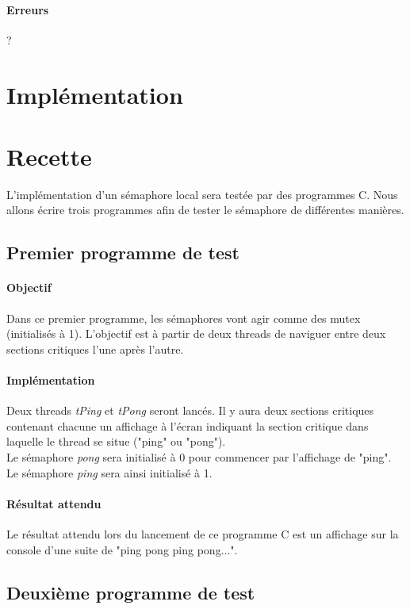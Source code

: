 \documentclass[12pt]{article}
\begin{document}
        \paragraph{Erreurs\\}
        ?
    \newpage

\section{Implémentation}
\newpage
\section{Recette}
L'implémentation d'un sémaphore local sera testée par des programmes C. Nous allons écrire trois programmes afin de tester le sémaphore de différentes manières.
\subsection{Premier programme de test}
  \paragraph{Objectif\\}
  Dans ce premier programme, les sémaphores vont agir comme des mutex (initialisés à 1). L'objectif est à partir de deux threads de naviguer entre deux sections critiques l'une après l'autre.
  \paragraph{Implémentation\\}
  Deux threads \textit{tPing} et \textit{tPong} seront lancés. Il y aura deux sections critiques contenant chacune un affichage à l'écran indiquant la section critique dans laquelle le thread se situe ("ping" ou "pong"). \\
  Le sémaphore \textit{pong} sera initialisé à 0 pour commencer par l'affichage de "ping". Le sémaphore \textit{ping} sera ainsi initialisé à 1.
  \paragraph{Résultat attendu\\}
  Le résultat attendu lors du lancement de ce programme C est un affichage sur la console d'une suite de "ping pong ping pong...".
\newpage
\subsection{Deuxième programme de test}
\end{document}
